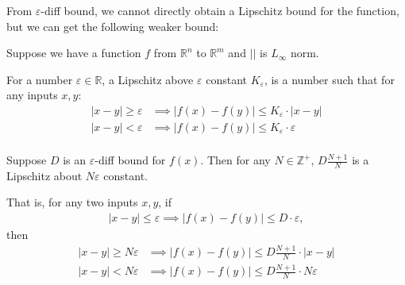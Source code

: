 \documentclass{llncs}
\begin{document}
	From $\varepsilon$-diff bound, we cannot directly obtain a Lipschitz bound for the function, but we can get the following weaker bound:
	
	\begin{definition}
		Suppose we have a function $f$ from $\mathbb{R}^n$ to $\mathbb{R}^m$ and $||$ is $L_\infty$ norm. 
		
		For a number $\varepsilon\in\mathbb{R}$, a Lipschitz above $\varepsilon$ constant  $K_\varepsilon$,  is a number such that for any inputs $x,y$: \begin{align*}
			|x-y|\geq \varepsilon &\implies |f(x)-f(y)| \leq K_\varepsilon \cdot |x-y|\\
			|x-y|<\varepsilon &\implies |f(x)-f(y)| \leq K_\varepsilon \cdot \varepsilon\\
		\end{align*}
		
	\end{definition}
	
	
	\begin{proposition}
		
		Suppose $D$ is an $\varepsilon$-diff bound for $f(x)$. Then for any $N\in\mathbb{Z}^+$, $D\frac{N+1}{N}$ is a Lipschitz about $N\varepsilon$ constant.
		
		That is, for any two inputs $x,y$, if \begin{align*}
			|x-y|\leq \varepsilon \implies |f(x)-f(y)| \leq D \cdot \varepsilon,
		\end{align*} then 	 \begin{align*}
			|x-y|\geq N\varepsilon &\implies |f(x)-f(y)| \leq D\frac{N+1}{N} \cdot |x-y|\\
			|x-y|<N\varepsilon &\implies |f(x)-f(y)| \leq D\frac{N+1}{N} \cdot N\varepsilon\\
		\end{align*}
	\end{proposition}
	
\end{document}
